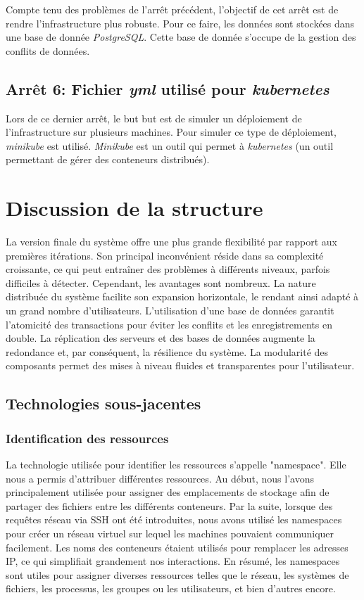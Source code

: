 \documentclass[a11paper, 11pt]{article}
\begin{document}
Compte tenu des problèmes de l'arrêt précédent, l'objectif de cet arrêt est de
rendre l'infrastructure plus robuste. Pour ce faire, les données sont stockées
dans une base de donnée \textit{PostgreSQL}. Cette base de donnée s'occupe de
la gestion des conflits de données.


\subsection{Arrêt 6: Fichier \textit{yml} utilisé pour \textit{kubernetes}}

Lors de ce dernier arrêt, le but but est de simuler un déploiement de
l'infrastructure sur plusieurs machines. Pour simuler ce type de déploiement,
\textit{minikube} est utilisé. \textit{Minikube} est un outil qui permet à
\textit{kubernetes} (un outil permettant de gérer des conteneurs distribués).




\section{Discussion de la structure}

La version finale du système offre une plus grande flexibilité par rapport aux
premières itérations. Son principal inconvénient réside dans sa complexité
croissante, ce qui peut entraîner des problèmes à différents niveaux, parfois
difficiles à détecter. Cependant, les avantages sont nombreux. La nature
distribuée du système facilite son expansion horizontale, le rendant ainsi
adapté à un grand nombre d'utilisateurs. L'utilisation d'une base de données
garantit l'atomicité des transactions pour éviter les conflits et les
enregistrements en double. La réplication des serveurs et des bases de données
augmente la redondance et, par conséquent, la résilience du système. La
modularité des composants permet des mises à niveau fluides et transparentes
pour l'utilisateur.

\subsection{Technologies sous-jacentes}

\subsubsection{Identification des ressources}

La technologie utilisée pour identifier les ressources s'appelle "namespace".
Elle nous a permis d'attribuer différentes ressources. Au début, nous l'avons
principalement utilisée pour assigner des emplacements de stockage afin de
partager des fichiers entre les différents conteneurs. Par la suite, lorsque
des requêtes réseau via SSH ont été introduites, nous avons utilisé les
namespaces pour créer un réseau virtuel sur lequel les machines pouvaient
communiquer facilement. Les noms des conteneurs étaient utilisés pour remplacer
les adresses IP, ce qui simplifiait grandement nos interactions. En résumé, les
namespaces sont utiles pour assigner diverses ressources telles que le réseau,
les systèmes de fichiers, les processus, les groupes ou les utilisateurs, et
bien d'autres encore.
\end{document}
